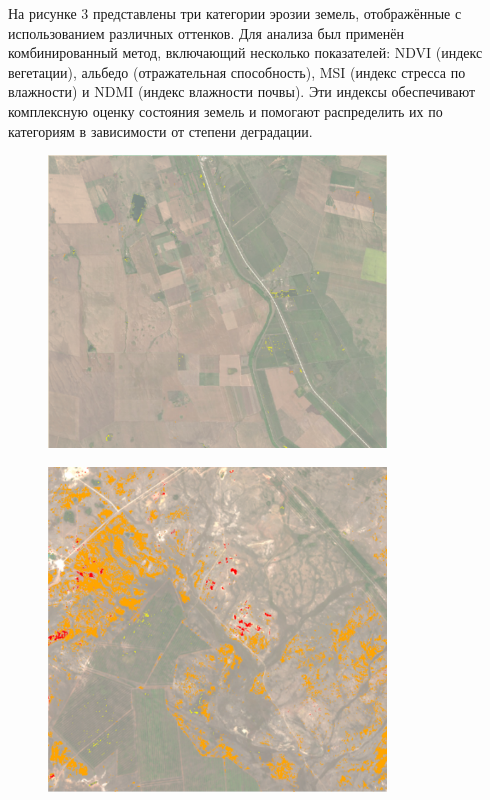 На рисунке 3 представлены три категории эрозии земель, отображённые с
использованием различных оттенков. Для анализа был применён
комбинированный метод, включающий несколько показателей: NDVI (индекс
вегетации), альбедо (отражательная способность), MSI (индекс стресса по
влажности) и NDMI (индекс влажности почвы). Эти индексы обеспечивают
комплексную оценку состояния земель и помогают распределить их по
категориям в зависимости от степени деградации.


\begin{figure}[H]
	\centering
	\includegraphics[width=0.8\textwidth]{media/ict/image35}
	\caption*{}
\end{figure}


\begin{figure}[H]
	\centering
	\includegraphics[width=0.8\textwidth]{media/ict/image36}
	\caption*{}
\end{figure}


